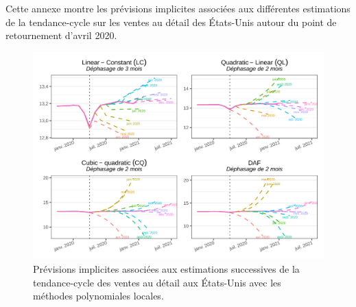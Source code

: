 \documentclass[
  12pt,
  french,
  12pt,a4paper]{article}
\newcommand\1{\mathds{1}}
\begin{document}
Cette annexe montre les prévisions implicites associées aux différentes estimations de la tendance-cycle sur les ventes au détail des États-Unis autour du point de retournement d'avril 2020.

\begin{figure}

{\centering \includegraphics[width=0.9\linewidth]{img/nber/retailx_lp_implicit_forecast} 

}

\caption[Prévisions implicites associées aux estimations successives de la tendance-cycle des ventes au détail aux États-Unis avec les méthodes polynomiales locales]{Prévisions implicites associées aux estimations successives de la tendance-cycle des ventes au détail aux États-Unis avec les méthodes polynomiales locales.}\label{fig:retailxiplp}

\footnotesize
\normalsize\end{figure}
\end{document}
